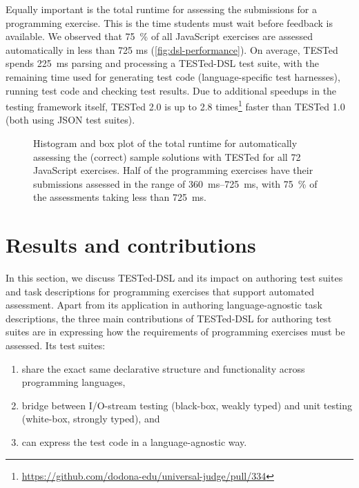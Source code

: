 \documentclass[../main]{subfiles}
\begin{document}
Equally important is the total runtime for assessing the submissions for a programming exercise.
This is the time students must wait before feedback is available.
We observed that \qty{75}{\percent} of all JavaScript exercises are assessed automatically in less than 725 ms (\vref{fig:dsl-performance}).
On average, TESTed spends \qty{225}{\milli\second} parsing and processing a TESTed-DSL test suite, with the remaining time used for generating test code (language-specific test harnesses), running test code and checking test results.
Due to additional speedups in the testing framework itself, TESTed 2.0 is up to 2.8 times\footnote{\url{https://github.com/dodona-edu/universal-judge/pull/334}} faster than TESTed 1.0 (both using JSON test suites).

\begin{figure}
    \centering
    
    \caption{Histogram and box plot of the total runtime for automatically assessing the (correct) sample solutions with TESTed for all \num{72} JavaScript exercises.
    Half of the programming exercises have their submissions assessed in the range of \SIrange{360}{725}{\milli\second}, with \qty{75}{\percent} of the assessments taking less than \qty{725}{\milli\second}.\label{fig:dsl-performance}}
\end{figure}

\section{Results and contributions}\label{sec:dsl-results-and-contributions}

In this section, we discuss TESTed-DSL and its impact on authoring test suites and task descriptions for programming exercises that support automated assessment.
Apart from its application in authoring language-agnostic task descriptions, the three main contributions of TESTed-DSL for authoring test suites are in expressing how the requirements of programming exercises must be assessed.
Its test suites:

\begin{enumerate}
    \item share the exact same declarative structure and functionality across programming languages,
    \item bridge between I/O-stream testing (black-box, weakly typed) and unit testing (white-box, strongly typed), and
    \item can express the test code in a language-agnostic way.
\end{enumerate}
\end{document}
